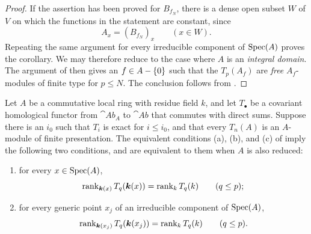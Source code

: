 \begin{proof}

If the assertion has been proved for $B_{f_N}$, there is a
dense open subset $W$ of $V$ on which the functions in the
statement are constant, since
\[
  A_x=(B_{f_N})_x
  \qquad(x\in W).
\]
Repeating the same argument for every irreducible component of
$\operatorname{Spec}(A)$ proves the corollary.  We may therefore reduce to
the case where $A$ is an \emph{integral domain}.  The argument of
 then gives an $f\in A-\{0\}$ such that the
$T_p(A_f)$ are \emph{free} $A_f$-modules of finite type for
$p\leq N$.  The conclusion follows from .
\end{proof}

\begin{proposition}[7.3.11]
\label{III.7.3.11}
Let $A$ be a commutative local ring with residue field $k$,
and let $T_\bullet$ be a covariant homological functor from
$\cat{Ab}_A$ to $\cat{Ab}$ that commutes with direct sums.
Suppose there is an $i_0$ such that $T_i$ is exact for
$i\leq i_0$, and that every $T_n(A)$ is an $A$-module of
finite presentation.  The equivalent conditions (a), (b), and
(c) of  imply the following two conditions,
and are equivalent to them when $A$ is also reduced:
\begin{enumerate}
  \item[(d)] for every $x\in\operatorname{Spec}(A)$,
    \[
      \operatorname{rank}_{\boldsymbol{k}(x)}
      T_q(\boldsymbol{k}(x))
      =
      \operatorname{rank}_k T_q(k)
      \qquad(q\leq p);
    \]
  \item[($\mathrm{d}'$)] for every generic point $x_j$ of an
    irreducible component of $\operatorname{Spec}(A)$,
    \[
      \operatorname{rank}_{\boldsymbol{k}(x_j)}
      T_q(\boldsymbol{k}(x_j))
      =
      \operatorname{rank}_k T_q(k)
      \qquad(q\leq p).
    \]
\end{enumerate}
\end{proposition}

